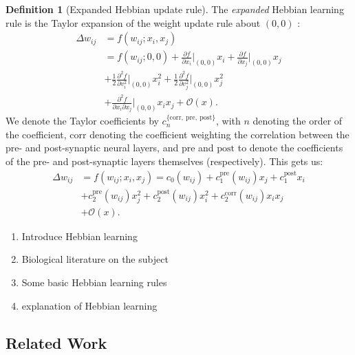 \documentclass{article}
\theoremstyle{definition}
\newtheorem{definition}{Definition}[subsection]
\begin{document}
\begin{definition}[Expanded Hebbian update rule]
    The \textit{expanded} Hebbian learning rule is the Taylor expansion
    of the weight update rule about $(0, 0)$ \parencite{gerstner_mathematical_2002}:
    \begin{align*}
        \Delta w_{ij} &= f(w_{ij}; x_i, x_j) \\
        &= f(w_{ij}; 0, 0) + \frac{\partial f}{\partial x_i} \big|_{(0, 0)} x_i + \frac{\partial f}{\partial x_j} 
\big|_{(0, 0)} x_j \\
&+ \frac{1}{2} \frac{\partial^2 f}{\partial v^2_i} \big|_{(0, 0)} x_i^2 + \frac{1}{2} \frac{\partial^2 f}{\partial v^2_j}\big|_{(0, 0)} x_j^2 \\
&+ \frac{\partial^2 f}{\partial x_i \partial x_j}\big|_{(0, 0)} x_i x_j + \mathcal{O}(x).
    \end{align*}
    We denote the Taylor coefficients by $c_n^{\{\text{corr},~\text{pre},~\text{post}\}}$, with 
    $n$ denoting the order of the coefficient, $\text{corr}$ denoting the coefficient 
    weighting the correlation between the pre- and post-synaptic neural layers, and 
    $\text{pre}$ and $\text{post}$ to denote the coefficients of the pre- and post-synaptic
    layers themselves (respectively).
    This gets us:
    \begin{align*}
    \Delta w_{ij} &= f(w_{ij}; x_i, x_j) =
    c_0 (w_{ij}) + c_1^\text{pre} (w_{ij}) x_j + c_1^\text{post} x_i \\
    &+ c_2^\text{pre} (w_{ij}) x_j^2 + c_2^\text{post} (w_{ij}) x_i^2 + c_2^\text{corr} (w_{ij}) x_i x_j \\
    &+ \mathcal{O} (x).
    \end{align*}
\end{definition}

\begin{enumerate}
    \item Introduce Hebbian learning
    \item Biological literature on the subject
    \item Some basic Hebbian learning rules
    \item \textcite{gerstner_mathematical_2002} explanation of Hebbian learning
\end{enumerate}

\subsection{Related Work}\label{sec:related-work}
\end{document}
